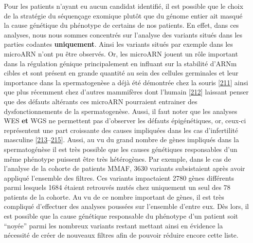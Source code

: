 \documentclass[12pt,a4paper,twoside]{ugathesis}
\theoremstyle{definition}
\theoremstyle{definition}
\theoremstyle{definition}
\theoremstyle{remark}
\begin{document}
Pour les patients n'ayant eu aucun candidat identifié, il est possible
que le choix de la stratégie du séquençage exomique plutôt que du génome
entier ait masqué la cause génétique du phénotype de certains de nos
patients. En effet, dans ces analyses, nous nous sommes concentrés sur
l'analyse des variants situés dans les parties codantes
\textbf{uniquement}. Ainsi les variants situés par exemple dans les
microARN n'ont pu être observés. Or, les microARN jouent un rôle
important dans la régulation génique principalement en influant sur la
stabilité d'ARNm cibles et sont présent en grande quantité au sein des
cellules germinales et leur importance dans la spermatogenèse a déjà été
démontrée chez la souris
{[}\protect\hyperlink{ref-Comazzetto2014}{211}{]} ainsi que plus
récemment chez d'autres mammifères dont l'humain
{[}\protect\hyperlink{ref-Chen2017}{212}{]} laissant penser que des
défauts altérants ces microARN pourraient entrainer des
dysfonctionnements de la spermatogenèse. Aussi, il faut noter que les
analyses WES \textbf{et} WGS ne permettent pas d'observer les défauts
épigénétiques, or, ceux-ci représentent une part croissante des causes
impliquées dans les cas d'infertilité masculine
{[}\protect\hyperlink{ref-Carrell2011}{213}--\protect\hyperlink{ref-Dada2012}{215}{]}.
Aussi, au vu du grand nombre de gènes impliqués dans la spermatogénèse
il est très possible que les causes génétiques responsables d'un même
phénotype puissent être très hétérogènes. Par exemple, dans le cas de
l'analyse de la cohorte de patients MMAF, 3630 variants subsistaient
après avoir appliqué l'ensemble des filtres. Ces variants impactaient
2780 gènes différents parmi lesquels 1684 étaient retrouvés mutés chez
uniquement un seul des 78 patients de la cohorte. Au vu de ce nombre
important de gènes, il est très compliqué d'effectuer des analyses
poussées sur l'ensemble d'entre eux. Dès lors, il est possible que la
cause génétique responsable du phénotype d'un patient soit ``noyée''
parmi les nombreux variants restant mettant ainsi en évidence la
nécessité de créer de nouveaux filtres afin de pouvoir réduire encore
cette liste.
\end{document}
